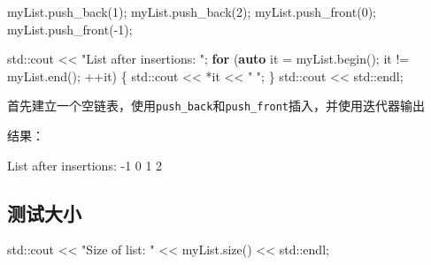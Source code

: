 \documentclass[
]{article}
\newenvironment{Shaded}{}{}
\newcommand{\BuiltInTok}[1]{\textcolor[rgb]{0.00,0.50,0.00}{#1}}
\newcommand{\ControlFlowTok}[1]{\textcolor[rgb]{0.00,0.44,0.13}{\textbf{#1}}}
\newcommand{\DecValTok}[1]{\textcolor[rgb]{0.25,0.63,0.44}{#1}}
\newcommand{\KeywordTok}[1]{\textcolor[rgb]{0.00,0.44,0.13}{\textbf{#1}}}
\newcommand{\NormalTok}[1]{#1}
\newcommand{\OperatorTok}[1]{\textcolor[rgb]{0.40,0.40,0.40}{#1}}
\newcommand{\StringTok}[1]{\textcolor[rgb]{0.25,0.44,0.63}{#1}}
\begin{document}
\begin{Shaded}
\begin{Highlighting}[]
\NormalTok{myList}\OperatorTok{.}\NormalTok{push\_back}\OperatorTok{(}\DecValTok{1}\OperatorTok{);}
\NormalTok{myList}\OperatorTok{.}\NormalTok{push\_back}\OperatorTok{(}\DecValTok{2}\OperatorTok{);}
\NormalTok{myList}\OperatorTok{.}\NormalTok{push\_front}\OperatorTok{(}\DecValTok{0}\OperatorTok{);}
\NormalTok{myList}\OperatorTok{.}\NormalTok{push\_front}\OperatorTok{({-}}\DecValTok{1}\OperatorTok{);}

\BuiltInTok{std::}\NormalTok{cout}\OperatorTok{ \textless{}\textless{}} \StringTok{"List after insertions: "}\OperatorTok{;}
\ControlFlowTok{for} \OperatorTok{(}\KeywordTok{auto}\NormalTok{ it }\OperatorTok{=}\NormalTok{ myList}\OperatorTok{.}\NormalTok{begin}\OperatorTok{();}\NormalTok{ it }\OperatorTok{!=}\NormalTok{ myList}\OperatorTok{.}\NormalTok{end}\OperatorTok{();} \OperatorTok{++}\NormalTok{it}\OperatorTok{)} \OperatorTok{\{}
    \BuiltInTok{std::}\NormalTok{cout}\OperatorTok{ \textless{}\textless{}} \OperatorTok{*}\NormalTok{it }\OperatorTok{\textless{}\textless{}} \StringTok{" "}\OperatorTok{;}
\OperatorTok{\}}
\BuiltInTok{std::}\NormalTok{cout}\OperatorTok{ \textless{}\textless{}} \BuiltInTok{std::}\NormalTok{endl}\OperatorTok{;}
\end{Highlighting}
\end{Shaded}

首先建立一个空链表，使用\texttt{push\_back}和\texttt{push\_front}插入，并使用迭代器输出

结果：

\begin{Shaded}
\begin{Highlighting}[]
\NormalTok{List after insertions: {-}1 0 1 2 }
\end{Highlighting}
\end{Shaded}

\hypertarget{ux6d4bux8bd5ux5927ux5c0f}{%
\subsection{测试大小}\label{ux6d4bux8bd5ux5927ux5c0f}}

\begin{Shaded}
\begin{Highlighting}[]
\BuiltInTok{std::}\NormalTok{cout}\OperatorTok{ \textless{}\textless{}} \StringTok{"Size of list: "} \OperatorTok{\textless{}\textless{}}\NormalTok{ myList}\OperatorTok{.}\NormalTok{size}\OperatorTok{()} \OperatorTok{\textless{}\textless{}} \BuiltInTok{std::}\NormalTok{endl}\OperatorTok{;}
\end{Highlighting}
\end{Shaded}
\end{document}
